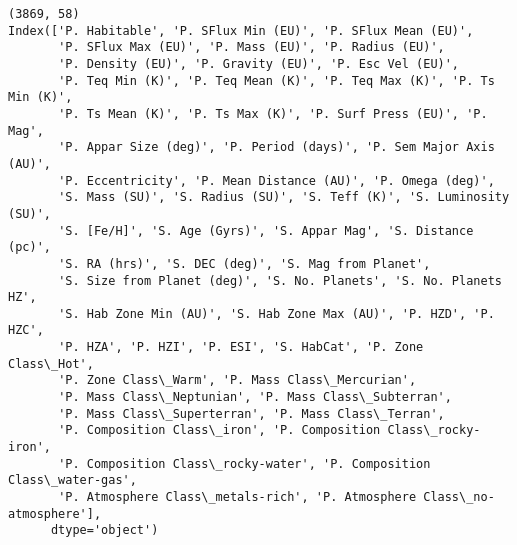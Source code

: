 \documentclass[11pt]{article}
\begin{document}
    \begin{Verbatim}[commandchars=\\\{\}]
(3869, 58)
Index(['P. Habitable', 'P. SFlux Min (EU)', 'P. SFlux Mean (EU)',
       'P. SFlux Max (EU)', 'P. Mass (EU)', 'P. Radius (EU)',
       'P. Density (EU)', 'P. Gravity (EU)', 'P. Esc Vel (EU)',
       'P. Teq Min (K)', 'P. Teq Mean (K)', 'P. Teq Max (K)', 'P. Ts Min (K)',
       'P. Ts Mean (K)', 'P. Ts Max (K)', 'P. Surf Press (EU)', 'P. Mag',
       'P. Appar Size (deg)', 'P. Period (days)', 'P. Sem Major Axis (AU)',
       'P. Eccentricity', 'P. Mean Distance (AU)', 'P. Omega (deg)',
       'S. Mass (SU)', 'S. Radius (SU)', 'S. Teff (K)', 'S. Luminosity (SU)',
       'S. [Fe/H]', 'S. Age (Gyrs)', 'S. Appar Mag', 'S. Distance (pc)',
       'S. RA (hrs)', 'S. DEC (deg)', 'S. Mag from Planet',
       'S. Size from Planet (deg)', 'S. No. Planets', 'S. No. Planets HZ',
       'S. Hab Zone Min (AU)', 'S. Hab Zone Max (AU)', 'P. HZD', 'P. HZC',
       'P. HZA', 'P. HZI', 'P. ESI', 'S. HabCat', 'P. Zone Class\_Hot',
       'P. Zone Class\_Warm', 'P. Mass Class\_Mercurian',
       'P. Mass Class\_Neptunian', 'P. Mass Class\_Subterran',
       'P. Mass Class\_Superterran', 'P. Mass Class\_Terran',
       'P. Composition Class\_iron', 'P. Composition Class\_rocky-iron',
       'P. Composition Class\_rocky-water', 'P. Composition Class\_water-gas',
       'P. Atmosphere Class\_metals-rich', 'P. Atmosphere Class\_no-atmosphere'],
      dtype='object')

    \end{Verbatim}
\end{document}

